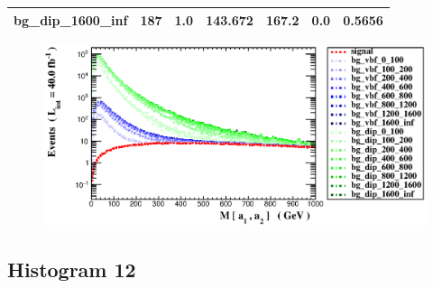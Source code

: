 \documentclass[a4paper, 10pt]{article}
\begin{document}
\begin{table}[H]
\begin{center}
\begin{tabular}{|m{23.0mm}|m{23.0mm}|m{18.0mm}|m{19.0mm}|m{19.0mm}|m{19.0mm}|m{19.0mm}|}
      \hline
      {\cellcolor{white}         bg\_dip\_1600\_inf}& {\cellcolor{white}         187}& {\cellcolor{white}         1.0}& {\cellcolor{white}         143.672}& {\cellcolor{white}         167.2}& {\cellcolor{green}         0.0}& {\cellcolor{green}         0.5656}\\
\hline
    \end{tabular}
  \end{center}
\end{table}

\begin{figure}[H]
  \begin{center}
    \includegraphics[scale=0.45]{selection_10.eps}\\
\caption{   }
  \end{center}
\end{figure}
      \newpage
\subsection{ Histogram 12}
\end{document}
